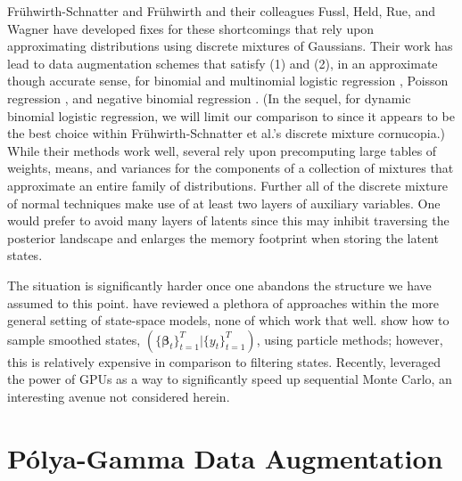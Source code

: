 \documentclass[12pt]{article}
\newcommand{\Polya}{P\'{o}lya}
\newcommand{\bbeta}{\boldsymbol{\beta}}
\newcounter{parnum}
\newcommand{\npoint}{%
  \noindent\refstepcounter{parnum}%
  \makebox[0.5in][c]{\textbf{\arabic{parnum}.}} %
  \marginnote{\small\ttfamily\the\inputlineno}}
\renewcommand{\npoint}{}
\begin{document}
\npoint Fr\"{u}hwirth-Schnatter and Fr\"{u}hwirth and their colleagues Fussl,
Held, Rue, and Wagner have developed fixes for these shortcomings that rely upon
approximating distributions using discrete mixtures of Gaussians.  Their work
has lead to data augmentation schemes that satisfy (1) and (2), in an
approximate though accurate sense, for binomial and multinomial logistic
regression \citep{fruhwirth-schnatter-fruhwirth-2007,
  fruhwirth-schnatter-fruhwirth-2010, fussl-etal-2013}, Poisson regression
\citep{fruhwirth-schnatter-wagner-2006, fruhwirth-schnatter-etal-2009}, and
negative binomial regression \citep{fruhwirth-schnatter-etal-2009}.  (In the
sequel, for dynamic binomial logistic regression, we will limit our comparison
to \cite{fussl-etal-2013} since it appears to be the best choice within
Fr\"{u}hwirth-Schnatter et al.'s discrete mixture cornucopia.)
\npoint While their methods work well, several rely upon precomputing large
tables of weights, means, and variances for the components of a collection of
mixtures that approximate an entire family of distributions.  Further all of the
discrete mixture of normal techniques make use of at least two layers of
auxiliary variables.  One would prefer to avoid many layers of latents since
this may inhibit traversing the posterior landscape and enlarges the memory
footprint when storing the latent states.

\npoint The situation is significantly harder once one abandons the structure we
have assumed to this point.  \cite{geweke-tanizaki-2001} have reviewed a
plethora of approaches within the more general setting of state-space models,
none of which work that well.  \cite{godsill-etal-2004} show how to sample
smoothed states, $(\{\bbeta_t\}_{t=1}^T | \{y_t\}_{t=1}^T)$, using particle
methods; however, this is relatively expensive in comparison to filtering
states.  Recently, \cite{geweke-etal-2013} leveraged the power of GPUs as a way
to significantly speed up sequential Monte Carlo, an interesting avenue not
considered herein.

\section{\Polya-Gamma Data Augmentation}
\label{sec:pg}
\end{document}
